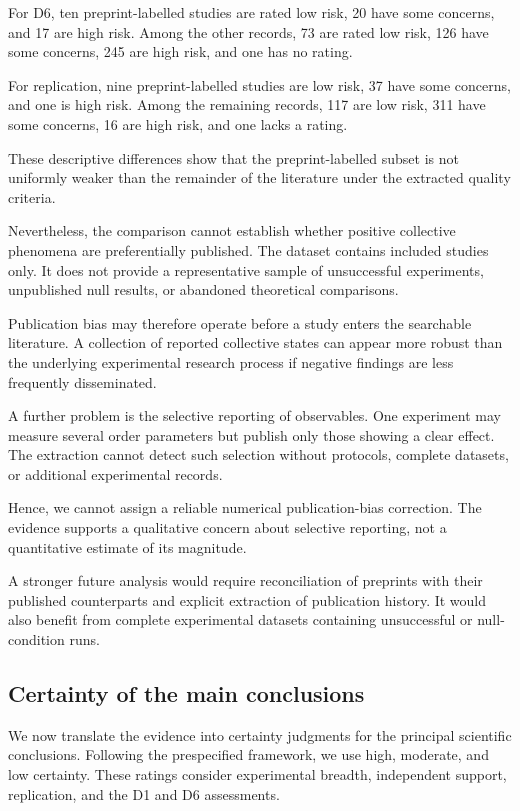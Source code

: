 For D6, ten preprint-labelled
studies are rated low risk,
20 have some concerns,
and 17 are high risk.
Among the other records,
73 are rated low risk,
126 have some concerns,
245 are high risk,
and one has no rating.

For replication, nine
preprint-labelled studies
are low risk,
37 have some concerns,
and one is high risk.
Among the remaining records,
117 are low risk,
311 have some concerns,
16 are high risk,
and one lacks a rating.

These descriptive differences
show that the preprint-labelled
subset is not uniformly weaker
than the remainder of the
literature under the
extracted quality criteria.

Nevertheless, the comparison
cannot establish whether
positive collective phenomena
are preferentially published.
The dataset contains included
studies only. It does not
provide a representative
sample of unsuccessful
experiments, unpublished
null results, or
abandoned theoretical
comparisons.

Publication bias may therefore
operate before a study enters
the searchable literature.
A collection of reported
collective states can appear
more robust than the
underlying experimental
research process if
negative findings are
less frequently disseminated.

A further problem is the
selective reporting of
observables. One experiment
may measure several order
parameters but publish
only those showing
a clear effect.
The extraction cannot
detect such selection
without protocols,
complete datasets,
or additional
experimental records.

Hence, we cannot assign
a reliable numerical
publication-bias correction.
The evidence supports
a qualitative concern
about selective reporting,
not a quantitative
estimate of its magnitude.

A stronger future analysis
would require reconciliation
of preprints with their
published counterparts
and explicit extraction
of publication history.
It would also benefit
from complete experimental
datasets containing
unsuccessful or
null-condition runs.

\subsection{Certainty of the main conclusions}
\label{sec:discussion-certainty}

We now translate the evidence into certainty
judgments for the principal scientific conclusions.
Following the prespecified framework, we use
high, moderate, and low certainty.
These ratings consider experimental breadth,
independent support, replication,
and the D1 and D6 assessments.

